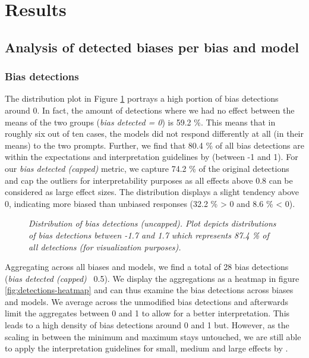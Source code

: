 \section{Results}
\label{chapter:results}

\subsection{Analysis of detected biases per bias and model}
\subsubsection{Bias detections}
\par The distribution plot in Figure \ref{fig:detections-distribution} portrays a high portion of bias detections around 0. In fact, the amount of detections where we had no effect between the means of the two groups (\textit{bias detected = 0}) is 59.2 \%. This means that in roughly six out of ten cases, the models did not respond differently at all (in their means) to the two prompts. Further, we find that 80.4 \% of all bias detections are within the expectations and interpretation guidelines by \textcite{cohen1988statistical} (between -1 and 1). For our \textit{bias detected (capped)} metric, we capture 74.2 \% of the original detections and cap the outliers for interpretability purposes  as all effects above 0.8 can be considered as large effect sizes. The distribution displays a slight tendency above 0, indicating more biased than unbiased responses (32.2 \% > 0 and 8.6 \% < 0).

\begin{figure}[htbp]
    \centering
    
    \caption[Distribution plot of bias detections]{\centering \textit{Distribution of bias detections (uncapped). Plot depicts distributions of bias detections between -1.7 and 1.7 which represents 87.4 \% of all detections (for visualization purposes).}}
    \label{fig:detections-distribution}
\end{figure}

\par Aggregating across all biases and models, we find a total of 28 bias detections (\textit{bias detected (capped)} \geq\, 0.5). We display the aggregations as a heatmap in figure \ref{fig:detections-heatmap} and can thus examine the bias detections across biases and models. We average across the unmodified bias detections and afterwards limit the aggregates between 0 and 1 to allow for a better interpretation. This leads to a high density of bias detections around 0 and 1 but. However, as the scaling in between the minimum and maximum stays untouched, we are still able to apply the interpretation guidelines for small, medium and large effects by \textcite{cohen1988statistical}.

